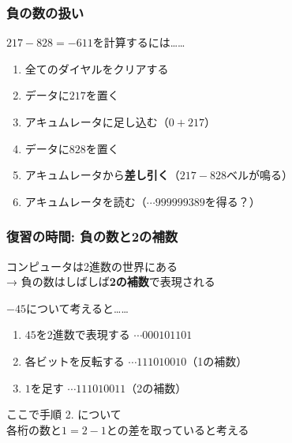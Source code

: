 \documentclass[
  lualatex,
  aspectratio=169,
  fleqn,
  14pt
]{beamer}
\begin{document}
\begin{frame}
  \frametitle{負の数の扱い}

  $217-828=-611$を計算するには……

  \begin{enumerate}
    \item
      全てのダイヤルをクリアする
    \item
      データに$217$を置く
    \item
      アキュムレータに足し込む（$0+217$）
    \item
      データに$828$を置く
    \item
      アキュムレータから\textbf{差し引く}（$217-828$\hspace{1\zw}ベルが鳴る）
    \item
      アキュムレータを読む（$\cdots999999389$を得る？）
  \end{enumerate}

\end{frame}

\begin{frame}
  \frametitle{復習の時間: 負の数と2の補数}

  コンピュータは2進数の世界にある\\
  \hspace{2.5\zw}→ 負の数はしばしば\textbf{2の補数}で表現される

  $-45$について考えると……

  \begin{enumerate}
    \item
      $45$を2進数で表現する
      \tab$\cdots000101101$
    \item
      各ビットを反転する
      \tab$\cdots111010010$（1の補数）
    \item
      $1$を足す
      \tab$\cdots111010011$（2の補数）
  \end{enumerate}

  ここで手順 2. について\\
  \hspace{2.5\zw}各桁の数と$1=2-1$との差を取っていると考える

\end{frame}
\end{document}
